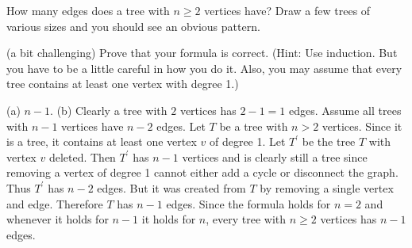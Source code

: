 \begin{requ}
\begin{lenum}
\item
How many edges does a tree with $n\geq 2$ vertices have? 
Draw a few trees of various sizes and you should see an obvious pattern.
\item
(a bit challenging) Prove that your formula is correct. 
(Hint: Use induction. But you have to be a little careful in how you do it.
Also, you may assume that every tree contains at least one vertex with degree 1.)
\end{lenum}
\begin{requanswer}
(a) $n-1$. 
(b) Clearly a tree with $2$ vertices has $2-1=1$ edges.
Assume all trees with $n-1$ vertices have $n-2$ edges.
Let $T$ be a tree with $n>2$ vertices. Since it is a tree, it contains at least one vertex $v$ of degree 1.
Let $T^\prime$ be the tree $T$ with vertex $v$ deleted.
Then $T^\prime$ has $n-1$ vertices and 
is clearly still a tree since removing a vertex of degree 1 cannot either add a cycle or disconnect the graph.
Thus $T^{\prime}$ has $n-2$ edges. But it was created from $T$ by removing a single vertex and edge.
Therefore $T$ has $n-1$ edges.
Since the formula holds for $n=2$ and whenever it holds for $n-1$ it holds for $n$, 
every tree with $n\geq 2$ vertices has $n-1$ edges.
\end{requanswer}
\end{requ}

